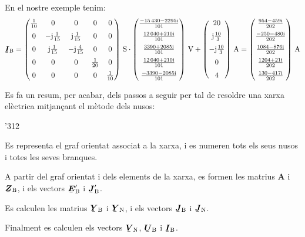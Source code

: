 \begin{list}{}
   En el nostre exemple tenim:
   \[
   \mcmplx{I}\ped{B} =
   \begin{pmatrix}
         \frac{1}{10} & 0 & 0 & 0 & 0 \\[2mm]
         0 & -\ju \frac{1}{15} & \ju \frac{1}{15} & 0 & 0 \\[2mm]
         0 & \ju \frac{1}{15} & -\ju \frac{4}{15} & 0 & 0 \\[2mm]
         0 & 0 & 0 & \frac{1}{20} & 0 \\[2mm]
         0 & 0 & 0 & 0 & \frac{1}{10}
   \end{pmatrix}\,\unit{S} \cdot
   \begin{pmatrix}
           \frac{\complexnum{ -15430 - j 2295}}{101} \\[2mm]
           \frac{\complexnum{12040 + j 210}}{101}  \\[2mm]
           \frac{\complexnum{3390 + j 2085}}{101} \\[2mm]
           \frac{\complexnum{ 12040 + j 210}}{101}  \\[2mm]
           \frac{\complexnum{ -3390 - j 2085}}{101}
      \end{pmatrix}\,\unit{V}
   + \begin{pmatrix}
         20 \\[2mm]
         \ju \frac{10}{3} \\[2mm]
         -\ju \frac{10}{3} \\[2mm]
         0 \\[2mm]
         4
      \end{pmatrix}\,\unit{A} =
     \begin{pmatrix}
      \frac{\complexnum{ 954 - j 459}}{202} \\[2mm]
      \frac{\complexnum{-250 - j 480}}{202}  \\[2mm]
      \frac{\complexnum{1084 - j 876}}{202} \\[2mm]
      \frac{\complexnum{1204 + j 21}}{202}  \\[2mm]
      \frac{\complexnum{130 - j 417}}{202}
   \end{pmatrix}\,\unit{A}
   \]

\end{list}

Es fa un resum, per acabar, dels passos a seguir per tal de resoldre una
xarxa elèctrica mitjançant el mètode dels nusos:
\begin{dingautolist}{'312}
   \item Es representa el graf orientat associat a la xarxa, i es numeren tots els seus nusos i totes les seves branques.
   \item A partir del graf orientat i dels elements de la xarxa, es formen les matrius $\boldsymbol{A}$ i $\mcmplx{Z}\ped{B}$, i els vectors $\mcmplx{E}\ped{B}'$ i $\mcmplx{J}\ped{B}'$.
   \item Es calculen les matrius $\mcmplx{Y}\ped{B}$ i $\mcmplx{Y}\ped{N}$, i els vectors $\mcmplx{J}\ped{B}$ i $\mcmplx{J}\ped{N}$.
   \item Finalment es calculen els vectors $\mcmplx{V}\ped{N}$, $\mcmplx{U}\ped{B}$ i $\mcmplx{I}\ped{B}$.
\end{dingautolist}


